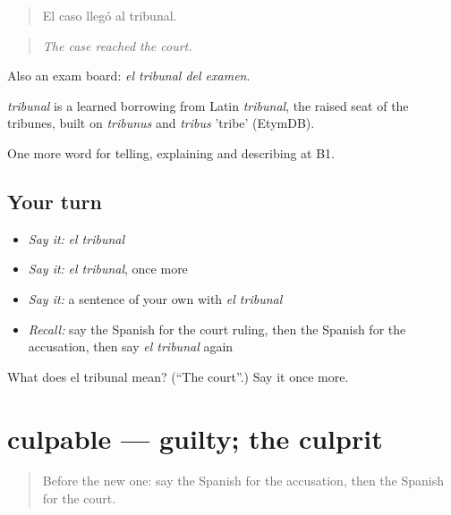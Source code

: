 \begin{quote}
El caso llegó al tribunal.
\end{quote}

\begin{quote}
\emph{The case reached the court.}
\end{quote}

Also an exam board: \emph{el tribunal del examen}.

\begin{cousinweb}
\emph{tribunal} is a learned borrowing from Latin \emph{tribunal}, the raised seat of the tribunes, built on \emph{tribunus} and \emph{tribus} 'tribe' (EtymDB).
\end{cousinweb}

\begin{grammarlens}[title={What you've built}]
One more word for telling, explaining and describing at B1.
\end{grammarlens}

\subsection*{Your turn}
\begin{itemize}
\raggedright
  \item \emph{Say it:} \emph{el tribunal}
  \item \emph{Say it:} \emph{el tribunal}, once more
  \item \emph{Say it:} a sentence of your own with \emph{el tribunal}
  \item \emph{Recall:} say the Spanish for the court ruling, then the Spanish for the accusation, then say \emph{el tribunal} again
\end{itemize}

\begin{tcolorbox}[breakable,colback=teal!4,colframe=teal!35!black,title={Before you move on}]
What does el tribunal mean? (\textquotedblleft{}The court\textquotedblright{}.) Say it once more.
\end{tcolorbox}
\section[culpable]{culpable — guilty; the culprit}

\label{lesson:ES-C626-culpable}



\begin{quote}
Before the new one: say the Spanish for the accusation, then the Spanish for the court.
\end{quote}

